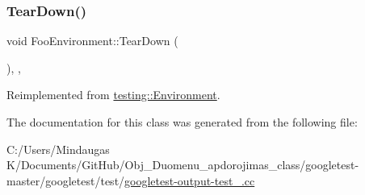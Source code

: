 \subsubsection{\texorpdfstring{TearDown()}{TearDown()}\hspace{0.1cm}{\footnotesize\ttfamily [3/3]}}
{\footnotesize\ttfamily void Foo\+Environment\+::\+Tear\+Down (\begin{DoxyParamCaption}{ }\end{DoxyParamCaption})\hspace{0.3cm}{\ttfamily [inline]}, {\ttfamily [override]}, {\ttfamily [virtual]}}



Reimplemented from \mbox{\hyperlink{classtesting_1_1_environment_a039bdaa705c46b9b88234cf4d3bb6254}{testing\+::\+Environment}}.



The documentation for this class was generated from the following file\+:\begin{DoxyCompactItemize}
\item 
C\+:/\+Users/\+Mindaugas K/\+Documents/\+Git\+Hub/\+Obj\+\_\+\+Duomenu\+\_\+apdorojimas\+\_\+class/googletest-\/master/googletest/test/\mbox{\hyperlink{googletest-master_2googletest_2test_2googletest-output-test___8cc}{googletest-\/output-\/test\+\_\+.\+cc}}\end{DoxyCompactItemize}
